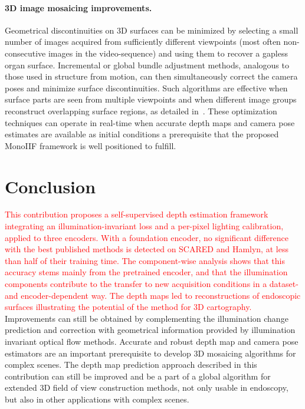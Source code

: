 \documentclass[a4paper,fleqn]{cas-dc}
\begin{document}
\paragraph{3D image mosaicing improvements.}

Geometrical discontinuities on 3D surfaces can be minimized by selecting a small number of images acquired from sufficiently different viewpoints (most often non-consecutive images in the video-sequence) and using them to recover a gapless organ surface. Incremental or global bundle adjustment methods, analogous to those used in structure from motion, can then simultaneously correct the camera poses and minimize surface discontinuities. Such algorithms are effective when surface parts are seen from multiple viewpoints and when different image groups reconstruct overlapping surface regions, as detailed in~\citep{Phan_PR_2020}. 
These optimization techniques can operate in real-time when accurate depth maps and camera pose estimates are available as initial conditions a prerequisite that the proposed MonoIIF framework is well positioned to fulfill.
%
\section{Conclusion\label{sec:conclusions}}

\textcolor{red}{This contribution proposes a self-supervised depth estimation framework integrating an illumination-invariant loss and a per-pixel lighting calibration, applied to three encoders. With a foundation encoder, no significant difference with the best published methods is detected on SCARED and Hamlyn, at less than half of their training time. The component-wise analysis shows that this accuracy stems mainly from the pretrained encoder, and that the illumination components contribute to the transfer to new acquisition conditions in a dataset- and encoder-dependent way. The depth maps led to reconstructions of endoscopic surfaces illustrating the potential of the method for 3D cartography.} Improvements can still be obtained by complementing the illumination change prediction and correction with geometrical information provided by illumination invariant optical flow methods. Accurate and robust depth map and camera pose estimators are an important prerequisite to develop 3D mosaicing algorithms for complex scenes. The depth map prediction approach described in this contribution can still be improved and be a part of a global algorithm for extended 3D field of view construction methods, not only usable in endoscopy, but also in other applications with complex scenes.  
\end{document}
